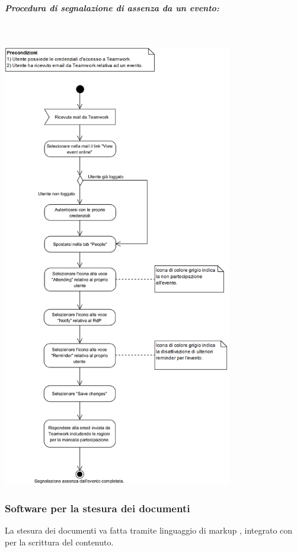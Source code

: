 \begin{samepage}
	\subparagraph{Procedura di segnalazione di assenza da un evento:}\mbox{}\\
	
	\begin{center}
		\includegraphics[width=10cm]{../../documenti/NormeDiProgetto/DiagrammiProcedure/SegnalazioneAssenzaDaUnEvento.png}
	\end{center}
	
\end{samepage}

\subsubsection{Software per la stesura dei documenti}
La stesura dei documenti va fatta tramite linguaggio di markup \glossario{\LaTeX{}}, integrato con  per la scrittura del contenuto. 

